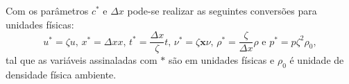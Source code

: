 Com os parâmetros $c^{*}$ e $\Delta x$ pode-se realizar as seguintes conversões para unidades físicas:
\begin{equation}
	\textbf{$u^{*}$} = \zeta \textbf{$u$}\text{, } \textbf{$x^{*}$} = \Delta x\textbf{$x$}
	\text{, } t^{*} = \frac{\Delta x}{\zeta}t \text{, } \nu^{*} = \zeta \textbf{x} \nu
	\text{, } \rho^{*} = \frac{\zeta}{\Delta x} \rho \text{ e } p^{*} = p \zeta^{2}  \rho_{0},
    \label{eq:conversao_1}
\end{equation}
tal que as variáveis assinaladas com $*$ são em unidades físicas e $\rho_{0}$ é unidade de densidade física ambiente.
